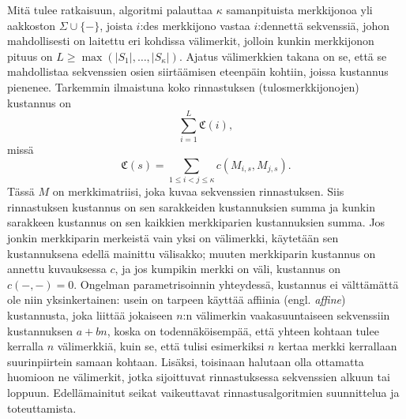 \documentclass[finnish]{tktltiki2}
\theoremstyle{definition}
\theoremstyle{remark}
\begin{document}
Mitä tulee ratkaisuun, algoritmi palauttaa $\kappa$ samanpituista merkkijonoa yli aakkoston $\Sigma \cup \{ - \}$, joista $i$:des merkkijono vastaa $i$:dennettä sekvenssiä, johon mahdollisesti on laitettu eri kohdissa välimerkit, jolloin kunkin merkkijonon pituus on $L \geq \max(|S_1|, \dots, |S_\kappa|)$. Ajatus välimerkkien takana on se, että se mahdollistaa sekvenssien osien siirtäämisen eteenpäin kohtiin, joissa kustannus pienenee. Tarkemmin ilmaistuna koko rinnastuksen (tulosmerkkijonojen) kustannus on
\[
\sum_{i = 1}^L \mathfrak{C}(i),
\]
missä 
\[
\mathfrak{C}(s) = \sum_{1 \leq i < j \leq \kappa} c(M_{i, s}, M_{j, s}).
\]
Tässä $M$ on merkkimatriisi, joka kuvaa sekvenssien rinnastuksen. Siis rinnastuksen kustannus on sen sarakkeiden kustannuksien summa ja kunkin sarakkeen kustannus on sen kaikkien merkkiparien kustannuksien summa. Jos jonkin merkkiparin merkeistä vain yksi on välimerkki, käytetään sen kustannuksena edellä mainittu välisakko; muuten merkkiparin kustannus on annettu kuvauksessa $c$, ja jos kumpikin merkki on väli, kustannus on $c(-,-) = 0$. Ongelman parametrisoinnin yhteydessä, kustannus ei välttämättä ole niin yksinkertainen: usein on tarpeen käyttää affiinia (engl. \textit{affine}) kustannusta, joka liittää jokaiseen $n$:n välimerkin vaakasuuntaiseen sekvenssiin  kustannuksen $a + bn$, koska on todennäköisempää, että yhteen kohtaan tulee kerralla $n$ välimerkkiä, kuin se, että tulisi esimerkiksi $n$ kertaa merkki kerrallaan suurinpiirtein samaan kohtaan. Lisäksi, toisinaan halutaan olla ottamatta huomioon ne välimerkit, jotka sijoittuvat rinnastuksessa sekvenssien alkuun tai loppuun. Edellämainitut seikat vaikeuttavat rinnastusalgoritmien suunnittelua ja toteuttamista.
 
\end{document}
